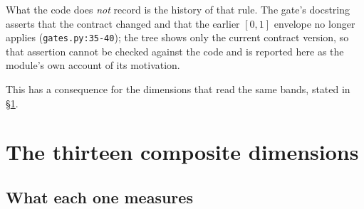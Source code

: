 \documentclass[11pt,a4paper]{article}
\newcommand{\code}[1]{\texttt{#1}}
\begin{document}
What the code does \emph{not} record is the history of that rule. The
gate's docstring asserts that the contract changed and that the earlier
$[0,1]$ envelope no longer applies (\code{gates.py:35-40}); the tree shows
only the current contract version, so that assertion cannot be checked
against the code and is reported here as the module's own account of its
motivation.

This has a consequence for the dimensions that read the same bands, stated
in \S\ref{sec:dimensions}.

\section{The thirteen composite dimensions}
\label{sec:dimensions}

\subsection{What each one measures}
\end{document}
